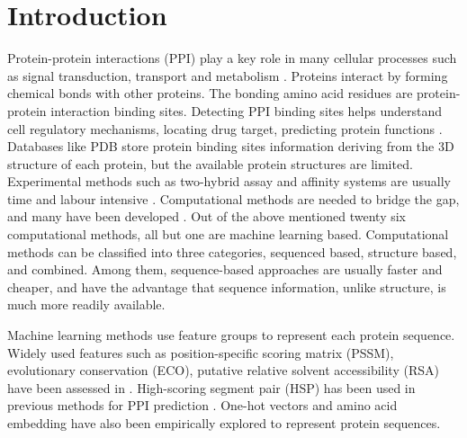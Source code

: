 \documentclass{bioinfo}
\begin{document}
\maketitle

\section{Introduction}
Protein-protein interactions (PPI) play a key role in many cellular processes such as signal transduction, transport and metabolism \citep{zhang2018review}. Proteins interact by forming chemical bonds with other proteins. The bonding amino acid residues are protein-protein interaction binding sites. Detecting PPI binding sites helps understand cell regulatory mechanisms, locating drug target, predicting protein functions \citep{bonetta2010interactome}. Databases like PDB \citep{berman2002protein} store protein binding sites information deriving from the 3D structure of each protein, but the available protein structures are limited. Experimental methods such as two-hybrid assay and affinity systems are usually time and labour intensive \citep{shoemaker2007deciphering}. Computational methods are needed to bridge the gap, and many have been developed \citep{cao2006enhanced, ofran2007isis, du2009improved, chen2009sequence, london2010structural, chen2010sequence, murakami2010applying, xue2011homppi, amos2011binding, jones2012psicov, asadabadi2013predictions, singh2014springs, wang2014fast, geng2015prediction, laine2015local, hwang2016hybrid, maheshwari2015prediction, liu2016prediction, wei2016protein, maheshwari2016template, jia2016ippbs, zhang2019sequence, wang2019protein, zhang2019scriber, zeng2019protein, xie2020prediction}. Out of the above mentioned twenty six computational methods, all but one are machine learning based. Computational methods can be classified into three categories, sequenced based, structure based, and combined. Among them, sequence-based approaches are usually faster  and cheaper, and have the advantage that sequence information, unlike structure, is much more readily available.

Machine learning methods use feature groups to represent each protein sequence. Widely used features such as position-specific scoring matrix (PSSM), evolutionary conservation (ECO), putative relative solvent accessibility (RSA) have been assessed in \citep{zhang2019comprehensive}. High-scoring segment pair (HSP) has been used in previous methods for PPI prediction \citep{li2017sprint}. One-hot vectors \citep{zhang2019sequence, zeng2019protein} and amino acid embedding \citep{asgari2015continuous, heinzinger2019modeling, asgari2019probabilistic} have also been empirically explored to represent protein sequences.
\end{document}

